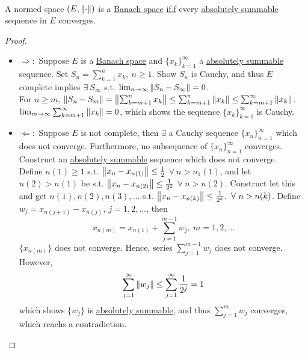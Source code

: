 \begin{theorem}\ \\
A normed space $(E, \norm{\cdot})$ is a \underline{Banach space} \underline{if.f} every \underline{absolutely summable} sequence in $E$ converges.
\end{theorem}
\begin{proof}\
\begin{itemize}
    \item $\Rightarrow:$ Suppose $E$ is a \underline{Banach space} and $\{x_k\}_{k=1}^\infty$ a \underline{absolutely summable} sequence. Set $S_n = \sum_{k = 1}^n x_k,\ n \geq 1$. Show $S_n$ is Cauchy, and thus $E$ complete implies $\exists\ S_\infty$ s.t. $\lim_{n \to \infty} \norm{S_n - S_\infty} = 0$.\\ For $n\geq m$, $\norm{S_n - S_m} = \norm{\sum_{k = m+1}^n x_k} \leq \sum_{k = m+1}^n \norm{x_k} \leq \sum_{k = m+1}^\infty \norm{x_k}$. $\lim_{m \to \infty} \sum_{k = m+1}^\infty \norm{x_k} = 0$, which shows the sequence $\{x_k\}_{k = 1}^\infty$ is Cauchy.
    \item $\Leftarrow:$ Suppose $E$ is not complete, then $\exists$ a Cauchy sequence $\{x_n\}_{n=1}^\infty$ which does not converge. Furthermore, no subsequence of $\{x_n\}_{n=1}^\infty$ converges. Construct an \underline{absolutely summable} sequence which does not converge.\\
    Define $n(1) \geq 1$ s.t. $\norm{x_n - x_{n(1)}} \leq \frac{1}{2}$ $\forall\ n > n_1(1)$, and let $n(2) > n(1)$ be s.t. $\norm{x_n - x_{n(2)}} \leq \frac{1}{2^2}$ $\forall\ n > n(2)$. Construct let this and get $n(1), n(2), n(3),\dots$ s.t. $\norm{x_n - x_{n(k)}} \leq \frac{1}{2^k},\ \forall\ n > n(k)$. Define $w_j = x_{n(j+1)} - x_{n(j)},\ j = 1,2,\dots$, then
    $$x_{n(m)} = x_{n(1)} + \sum_{j = 1}^{m-1} w_j,\ m = 1,2,\dots$$
    $\{x_{n(m)}\}$ does not converge. Hence, series $\sum_{j = 1}^{m-1} w_j$ does not converge. However,
    $$\sum_{j = 1}^\infty \norm{w_j} \leq \sum_{j = 1}^\infty \frac{1}{2^j} = 1$$
    which shows $\{w_j\}$ is \underline{absolutely summable}, and thus $\sum_{j = 1}^m w_j$ converges, which reachs a contradiction.
\end{itemize} 
\end{proof}

